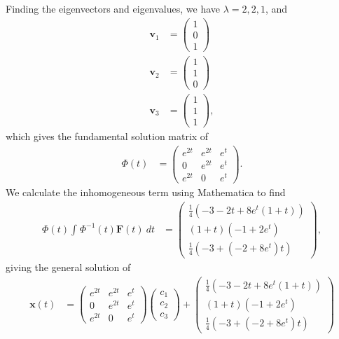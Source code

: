 \documentclass[10pt]{mypackage}
\begin{document}
\begin{solution}[8.3, Problem 30]
  Finding the eigenvectors and eigenvalues, we have $\lambda = 2,2,1$, and
  \begin{align*}
    \mathbf{v}_1 &= \begin{pmatrix}1\\0\\1\end{pmatrix}\\
    \mathbf{v}_2 &= \begin{pmatrix}1\\1\\0\end{pmatrix}\\
    \mathbf{v}_3 &= \begin{pmatrix}1\\1\\1\end{pmatrix},
  \end{align*}
  which gives the fundamental solution matrix of
  \begin{align*}
    \Phi(t) &= \begin{pmatrix}e^{2t} & e^{2t} & e^{t} \\ 0 & e^{2t} & e^{t} \\ e^{2t} & 0 & e^{t}\end{pmatrix}.
  \end{align*}
  We calculate the inhomogeneous term using Mathematica to find
  \begin{align*}
    \Phi\left( t \right)\int_{}^{} \Phi^{-1}\left( t \right)\mathbf{F}(t)\:dt &= \begin{pmatrix}\frac{1}{4}\left( -3-2t + 8e^{t}\left( 1+t \right) \right) \\ \left( 1+t \right)\left( -1 + 2e^{t} \right) \\ \frac{1}{4}\left( -3 + \left( -2 + 8e^{t} \right)t \right)\end{pmatrix},
  \end{align*}
  giving the general solution of
  \begin{align*}
    \mathbf{x}(t) &= \begin{pmatrix}e^{2t} & e^{2t} & e^{t} \\ 0 & e^{2t} & e^{t} \\ e^{2t} & 0 & e^{t}\end{pmatrix} \begin{pmatrix}c_1\\c_2\\c_3\end{pmatrix} + \begin{pmatrix}\frac{1}{4}\left( -3-2t + 8e^{t}\left( 1+t \right) \right) \\ \left( 1+t \right)\left( -1 + 2e^{t} \right) \\ \frac{1}{4}\left( -3 + \left( -2 + 8e^{t} \right)t \right)\end{pmatrix}
  \end{align*}
\end{solution}
\end{document}
